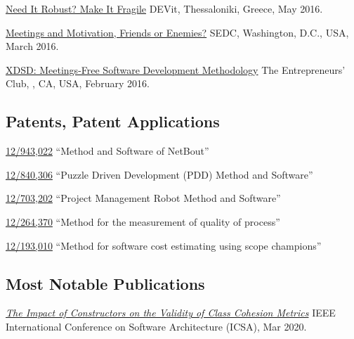 \documentclass{vl}
\begin{document}
    \begin{samepage}
        \href{https://www.youtube.com/watch?v=nCGBgI1MNwE}{Need It Robust? Make It Fragile}\newline
        DEVit, Thessaloniki, Greece, May 2016.
    \end{samepage}

    \begin{samepage}
        \href{https://www.youtube.com/watch?v=LB_YLWhGrco}{Meetings and Motivation, Friends or Enemies?}\newline
        SEDC, Washington, D.C., USA, March 2016.
    \end{samepage}

    \begin{samepage}
        \href{https://www.youtube.com/watch?v=qRZYJGYdrwk}{XDSD: Meetings-Free Software Development Methodology}\newline
        The Entrepreneurs' Club, , CA, USA, February 2016.
    \end{samepage}

    \subsection*{Patents, Patent Applications}

    \href{https://patents.google.com/patent/US20120117164}{12/943,022}
    ``Method and Software of NetBout''

    \href{https://patents.google.com/patent/US20120023476}{12/840,306}
    ``Puzzle Driven Development (PDD) Method and Software''

    \href{https://patents.google.com/patent/US20110196798}{12/703,202}
    ``Project Management Robot Method and Software''

    \href{https://patents.google.com/patent/US20100114638}{12/264,370}
    ``Method for the measurement of quality of process''

    \href{https://patents.google.com/patent/US20100042968}{12/193,010}
    ``Method for software cost estimating using scope champions''

    \subsection*{Most Notable Publications}

    \begin{samepage}
        \emph{\href{https://www.yegor256.com/pdf/2020/icsa20.pdf}{The Impact of Constructors on the Validity of Class Cohesion Metrics}}\newline
        IEEE International Conference on Software Architecture (ICSA), Mar 2020.
    \end{samepage}
\end{document}
